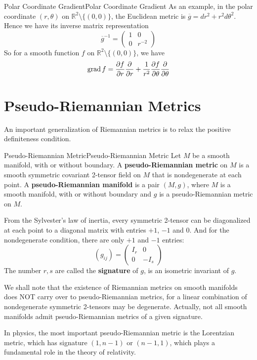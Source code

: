\documentclass[../main.tex]{subfiles}
\begin{document}
\begin{example}{Polar Coordinate Gradient}{Polar Coordinate Gradient}
  As an example, in the polar coordinate $(r, \theta)$ on $\mathbb{R}^2\setminus \{(0,0)\}$, the Euclidean metric is $\overline{g} = dr^2 + r^2 d\theta^2$. Hence we have its inverse matrix representation
  \begin{equation*}
    \overline{g}^{-1} = \begin{pmatrix}
      1 & 0 \\
      0 & r^{-2}
    \end{pmatrix}
  \end{equation*}
  So for a smooth function $f$ on $\mathbb{R}^2\setminus \{(0,0)\}$, we have
  \begin{equation*}
    \operatorname{grad} f = \frac{\partial f}{\partial r} \frac{\partial}{\partial r} + \frac{1}{r^2} \frac{\partial f}{\partial \theta} \frac{\partial}{\partial \theta}
  \end{equation*}
\end{example}

\section{Pseudo-Riemannian Metrics}
An important generalization of Riemannian metrics is to relax the positive definiteness condition.
\begin{definition}{Pseudo-Riemannian Metric}{Pseudo-Riemannian Metric}
  Let $M$ be a smooth manifold, with or without boundary. A \textbf{pseudo-Riemannian metric} on $M$ is a smooth symmetric covariant 2-tensor field on $M$ that is nondegenerate at each point. A \textbf{pseudo-Riemannian manifold} is a pair $(M,g)$, where $M$ is a smooth manifold, with or without boundary and $g$ is a pseudo-Riemannian metric on $M$.
\end{definition}

From the Sylvester's law of inertia, every symmetric 2-tensor can be diagonalized at each point to a diagonal matrix with entries $+1$, $-1$ and $0$. And for the nondegenerate condition, there are only $+1$ and $-1$ entries:
\begin{equation*}
  (g_{ij}) = \begin{pmatrix}
    I_r & 0 \\
    0 & -I_s
  \end{pmatrix}
\end{equation*}
The number $r,s$ are called the \textbf{signature} of $g$, is an isometric invariant of $g$.

We shall note that the existence of Riemannian metrics on smooth manifolds does NOT carry over to pseudo-Riemannian metrics, for a linear combination of nondegenerate symmetric 2-tensors may be degenerate. Actually, not all smooth manifolds admit pseudo-Riemannian metrics of a given signature.

\begin{remark}
  In physics, the most important pseudo-Riemannian metric is the Lorentzian metric, which has signature $(1,n-1)$ or $(n-1,1)$, which plays a fundamental role in the theory of relativity.
\end{remark}
\end{document}
